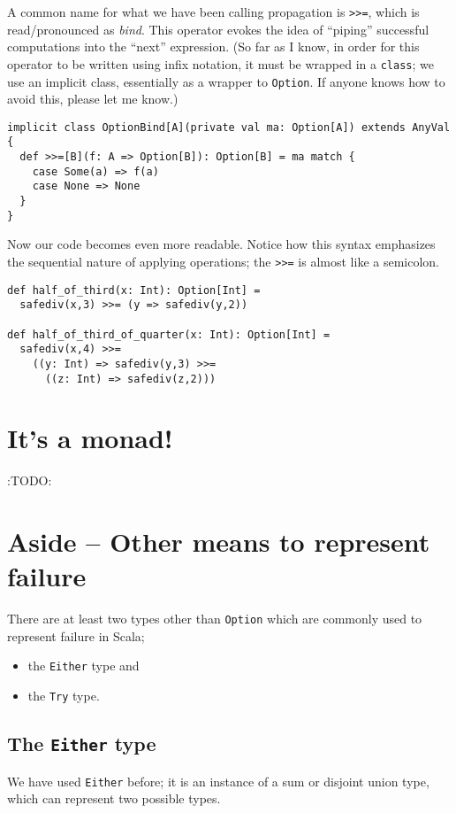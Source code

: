 \documentclass[11pt]{article}
\begin{document}
A common name for what we have been calling
propagation is \texttt{>>=}, which is read/pronounced as \emph{bind}.
This operator evokes the idea of “piping” successful computations
into the “next” expression.
(So far as I know, in order for this operator to be written
 using infix notation, it must be wrapped in a \texttt{class};
 we use an implicit class, essentially as a wrapper to \texttt{Option}.
 If anyone knows how to avoid this, please let me know.)
\begin{verbatim}
implicit class OptionBind[A](private val ma: Option[A]) extends AnyVal {
  def >>=[B](f: A => Option[B]): Option[B] = ma match {
    case Some(a) => f(a)
    case None => None
  }
}
\end{verbatim}

Now our code becomes even more readable.
Notice how this syntax emphasizes the sequential nature
of applying operations; the \texttt{>>=} is almost like a semicolon.
\begin{verbatim}
def half_of_third(x: Int): Option[Int] =
  safediv(x,3) >>= (y => safediv(y,2))

def half_of_third_of_quarter(x: Int): Option[Int] =
  safediv(x,4) >>=
    ((y: Int) => safediv(y,3) >>=
      ((z: Int) => safediv(z,2)))
\end{verbatim}

\section{It's a monad!}
\label{sec:orgf0c46fc}
:TODO:

\section{Aside – Other means to represent failure}
\label{sec:orga0c6232}
There are at least two types other than \texttt{Option} which
are commonly used to represent failure in Scala;
\begin{itemize}
\item the \texttt{Either} type and
\item the \texttt{Try} type.
\end{itemize}

\subsection{The \texttt{Either} type}
\label{sec:org1872663}
We have used \texttt{Either} before; it is an instance of a sum or
disjoint union type, which can represent two possible types.
\end{document}
